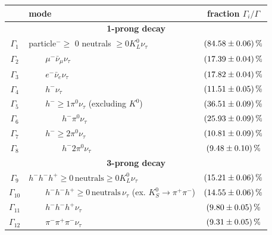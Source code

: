 \begin{table}[htbp]
		\centering
		\begin{tabular*}{\linewidth}{@{\extracolsep{\fill}}clc}
		\hline
		\hline
		&\textbf{mode}&  \textbf{fraction }$\Gamma_i/\Gamma$
		\\
		\hline
                \multicolumn{3}{c}{\textbf{1-prong decay}}
                \\
                $\Gamma_1$       & particle$^-\geq$ 0 neutrals $\geq 0K_L^0\nu_\tau$ & $\SI{84.58\pm0.06}{\percent}$
                \\
                $\Gamma_2$       & $\qquad \mu^-\bar{\nu}_\mu\nu_\tau$               & $\SI{17.39\pm0.04}{\percent}$
                \\
                $\Gamma_3$       & $\qquad e^-\bar{\nu}_e\nu_\tau$                   & $\SI{17.82\pm0.04}{\percent}$
                \\
                $\Gamma_4$       & $\qquad h^-\nu_\tau$                             & $\SI{11.51\pm0.05}{\percent}$
                \\
                $\Gamma_5$       & $\qquad h^-\geq 1\pi^0\nu_\tau$ (excluding $K^0$)  & $\SI{36.51\pm0.09}{\percent}$
                \\
                $\Gamma_6$       & $\qquad\qquad h^-\pi^0\nu_\tau$                   & $\SI{25.93\pm0.09}{\percent}$
                \\
                $\Gamma_7$       & $\qquad h^-\geq 2\pi^0\nu_\tau$                  & $\SI{10.81\pm0.09}{\percent}$
                \\
                $\Gamma_8$       & $\qquad\qquad h^-2\pi^0\nu_\tau$                   & $\SI{9.48\pm0.10}{\percent}$
                \\
                \hline
                \multicolumn{3}{c}{\textbf{3-prong decay}}
                \\
                $\Gamma_{9}$    & $h^-h^-h^+ \geq 0\,\text{neutrals}\geq 0K_L^0\nu_\tau$ & $\SI{15.21\pm0.06}{\percent}$
                \\
                $\Gamma_{10}$    & $\qquad h^-h^-h^+ \geq 0\,\text{neutrals}\,\nu_\tau$ (ex. $K_S^0\rightarrow \pi^+\pi^-$)      & $\SI{14.55\pm0.06}{\percent}$
                \\
                $\Gamma_{11}$    & $\qquad h^-h^-h^+\nu_\tau$                          & $\SI{9.80\pm0.05}{\percent}$
                \\
                $\Gamma_{12}$    & $\qquad \pi^-\pi^+\pi^-\nu_\tau$                          & $\SI{9.31\pm0.05}{\percent}$

\end{tabular*}
\end{table}
